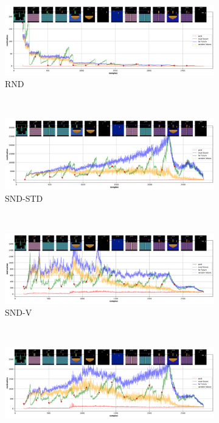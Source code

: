 \documentclass[a4paper,11pt]{elsarticle}
\begin{document}
\fi

\begin{figure}[t!]
  \begin{subfigure}{1.0\textwidth}
    \centering\includegraphics[width=12cm]{fig/results/novelty_detection/rnd_result_summary.png}
    \caption{RND}
    \label{fig:nov_rnd_result_summary}
   \end{subfigure}
  \\
  \begin{subfigure}{1.0\textwidth}
    \centering\includegraphics[width=12cm]{fig/results/novelty_detection/cnd_nce_summary.png}
    \caption{SND-STD}
    \label{fig:nov_nce_result_summary}
   \end{subfigure}
  \\
  \begin{subfigure}{1.0\textwidth}
    \centering\includegraphics[width=12cm]{fig/results/novelty_detection/cnd_msev_result_summary.png}
    \caption{SND-V}
    \label{fig:nov_mse_result_summary}
   \end{subfigure}
  \\
  \begin{subfigure}{1.0\textwidth}
    \centering\includegraphics[width=12cm]{fig/results/novelty_detection/cnd_vicreg_result_summary.png}

\end{subfigure}
\end{figure}
\end{document}
